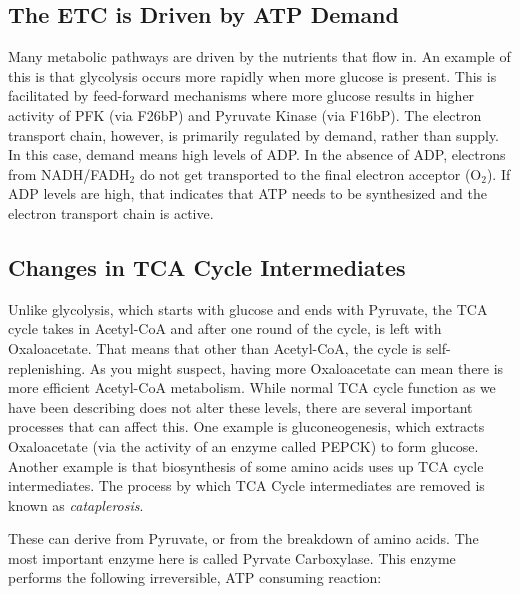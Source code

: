 \documentclass{tufte-handout}
\begin{document}
\subsection{The ETC is Driven by ATP Demand}

Many metabolic pathways are driven by the nutrients that flow in.  An example of this is that glycolysis occurs more rapidly when more glucose is present.  This is facilitated by feed-forward mechanisms where more glucose results in higher activity of PFK (via F26bP) and Pyruvate Kinase (via F16bP).  The electron transport chain, however, is primarily regulated by demand, rather than supply.  In this case, demand means high levels of ADP.  In the absence of ADP, electrons from NADH/FADH$_2$ do not get transported to the final electron acceptor (O$_2$).  If ADP levels are high, that indicates that ATP needs to be synthesized and the electron transport chain is active.  

\subsection{Changes in TCA Cycle Intermediates}

  Unlike glycolysis, which starts with glucose and ends with Pyruvate, the TCA cycle takes in Acetyl-CoA and after one round of the cycle, is left with Oxaloacetate.  That means that other than Acetyl-CoA, the cycle is self-replenishing.  As you might suspect, having more Oxaloacetate can mean there is more efficient Acetyl-CoA metabolism.  While normal TCA cycle function as we have been describing does not alter these levels, there are several important processes that can affect this.  One example is gluconeogenesis, which extracts Oxaloacetate (via the activity of an enzyme called PEPCK) to form glucose.  Another example is that biosynthesis of some amino acids uses up TCA cycle intermediates.  The process by which TCA Cycle intermediates are removed is known as \emph{cataplerosis}.

  These can derive from Pyruvate, or from the breakdown of amino acids.  The most important enzyme here is called Pyrvate Carboxylase.  This enzyme performs the following irreversible, ATP consuming reaction:
\end{document}
